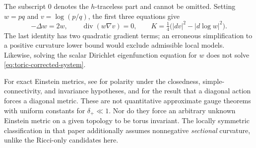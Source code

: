 \documentclass[a4paper,11pt]{article}
\numberwithin{equation}{section}
\theoremstyle{definition}
\begin{document}
The subscript $0$ denotes the $h$-traceless part and cannot be omitted.
Setting $w=pq$ and $v=\log(p/q)$, the first three equations give
\begin{equation}\label{eq:toric-w-v}
 -\Delta w=2w,\qquad \operatorname{div}(w\nabla v)=0,\qquad
 K=\tfrac14\bigl(|dv|^2-|d\log w|^2\bigr).
\end{equation}
The last identity has two quadratic gradient terms; an erroneous simplification to a positive curvature lower bound would exclude admissible local models.
Likewise, solving the scalar Dirichlet eigenfunction equation for $w$ does not solve \eqref{eq:toric-corrected-system}.

For exact Einstein metrics, see \cite[Theorem 1.2 and \S6, Proposition 5]{Liu2025} for polarity under the closedness, simple-connectivity, and invariance hypotheses, and for the result that a diagonal action forces a diagonal metric.
These are not quantitative approximate gauge theorems with uniform constants for $\delta_+\ll1$.
Nor do they force an arbitrary unknown Einstein metric on a given topology to be torus invariant.
The locally symmetric classification in that paper additionally assumes nonnegative \emph{sectional} curvature, unlike the Ricci-only candidates here.
\end{document}
